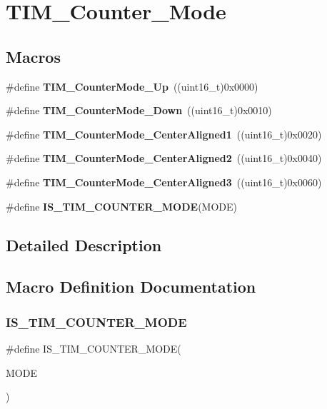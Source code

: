 \section{T\+I\+M\+\_\+\+Counter\+\_\+\+Mode}
\label{group__TIM__Counter__Mode}
\subsection*{Macros}
\begin{DoxyCompactItemize}
\item 
\#define \textbf{ T\+I\+M\+\_\+\+Counter\+Mode\+\_\+\+Up}~((uint16\+\_\+t)0x0000)
\item 
\#define \textbf{ T\+I\+M\+\_\+\+Counter\+Mode\+\_\+\+Down}~((uint16\+\_\+t)0x0010)
\item 
\#define \textbf{ T\+I\+M\+\_\+\+Counter\+Mode\+\_\+\+Center\+Aligned1}~((uint16\+\_\+t)0x0020)
\item 
\#define \textbf{ T\+I\+M\+\_\+\+Counter\+Mode\+\_\+\+Center\+Aligned2}~((uint16\+\_\+t)0x0040)
\item 
\#define \textbf{ T\+I\+M\+\_\+\+Counter\+Mode\+\_\+\+Center\+Aligned3}~((uint16\+\_\+t)0x0060)
\item 
\#define \textbf{ I\+S\+\_\+\+T\+I\+M\+\_\+\+C\+O\+U\+N\+T\+E\+R\+\_\+\+M\+O\+DE}(M\+O\+DE)
\end{DoxyCompactItemize}


\subsection{Detailed Description}


\subsection{Macro Definition Documentation}
\mbox{\label{group__TIM__Counter__Mode_ga9543fec190793e800d5d1b1b853636f5}} 
\subsubsection{I\+S\+\_\+\+T\+I\+M\+\_\+\+C\+O\+U\+N\+T\+E\+R\+\_\+\+M\+O\+DE}
{\footnotesize\ttfamily \#define I\+S\+\_\+\+T\+I\+M\+\_\+\+C\+O\+U\+N\+T\+E\+R\+\_\+\+M\+O\+DE(\begin{DoxyParamCaption}\item[{}]{M\+O\+DE }\end{DoxyParamCaption})}

